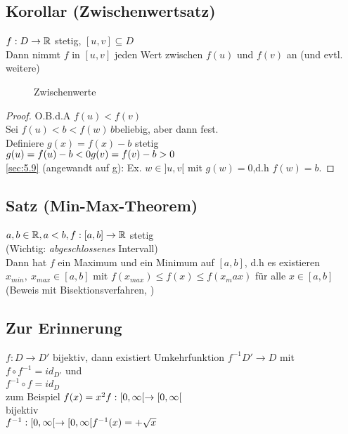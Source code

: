 \subsection{Korollar (Zwischenwertsatz)}\label{sec:5.10}
$f: D \rightarrow \mathbb{R} $ stetig, $[u,v] \subseteq D$\\
Dann nimmt $f$ in $[u,v]$ jeden Wert zwischen $f(u)$ und $f(v)$ an (und evtl. weitere)
\begin{figure}[h!]
\centering
{}
\caption{Zwischenwerte}
\end{figure}
\begin{proof}
O.B.d.A $f(u) < f(v)$\\
Sei $f(u) < b < f(w)\, b$\quad beliebig, aber dann fest.\\
Definiere $g(x) = f(x) -b $ stetig\\
$g(u) = f(u) -b < 0\\
g(v) = f(v) -b > 0$\\
\ref{sec:5.9} (angewandt auf g): Ex. $w \in ]u,v[$ mit $g(w) = 0$,d.h $f(w) =b$.
\end{proof}
\subsection{Satz (Min-Max-Theorem)}\label{sec:5.11}
$a,b \in \mathbb{R} , a < b, f : [a,b] \to \mathbb{R}$ stetig\\
(Wichtig: \emph{abgeschlossenes} Intervall)\\
Dann hat $f$ ein Maximum und ein Minimum auf $[a,b]$, d.h es existieren\\ $x_{min},\ x_{max} \in [a,b]$ mit $f(x_{max}) \leq f(x) \leq f(x_max)$ für alle $x \in [a,b]$ (Beweis mit Bisektionsverfahren, \cite{k4})
\subsection*{Zur Erinnerung}
$f: D \to D'$ bijektiv, dann existiert Umkehrfunktion $f^{-1} D' \to D$ mit \\
$f \circ f^{-1} = id_{D'}$ und \\
$f^{-1} \circ f = id_D$\\
zum Beispiel $f(x) = x^2\\
f :[0,\infty[ \to [0,\infty[$\\
bijektiv\\
$f^{-1} :[0,\infty[ \to [0,\infty[\\
f^{-1}(x) = +\sqrt{x}$
